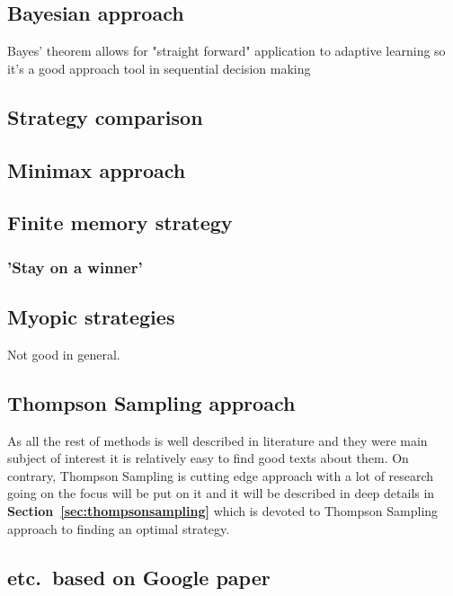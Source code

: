 \documentclass[12pt, a4paper, pdflatex]{report}
\begin{document}
\subsection{Bayesian approach}
Bayes' theorem allows for "straight forward" application to adaptive learning so it's a good approach tool in sequential decision making 

\subsection{Strategy comparison}

\subsection{Minimax approach}

\subsection{Finite memory strategy}
\subsubsection{'Stay on a winner'}

\subsection{Myopic strategies}
Not good in general.

\subsection{Thompson Sampling approach}
As all the rest of methods is well described in literature and they were main subject of interest it is relatively easy to find good texts about them. On contrary, Thompson Sampling is cutting edge approach with a lot of research going on the focus will be put on it and it will be described in deep details in  \textbf{Section~\ref{sec:thompsonsampling}} which is devoted to Thompson Sampling approach to finding an optimal strategy.

\subsection{etc.\ based on Google paper}
\end{document}
